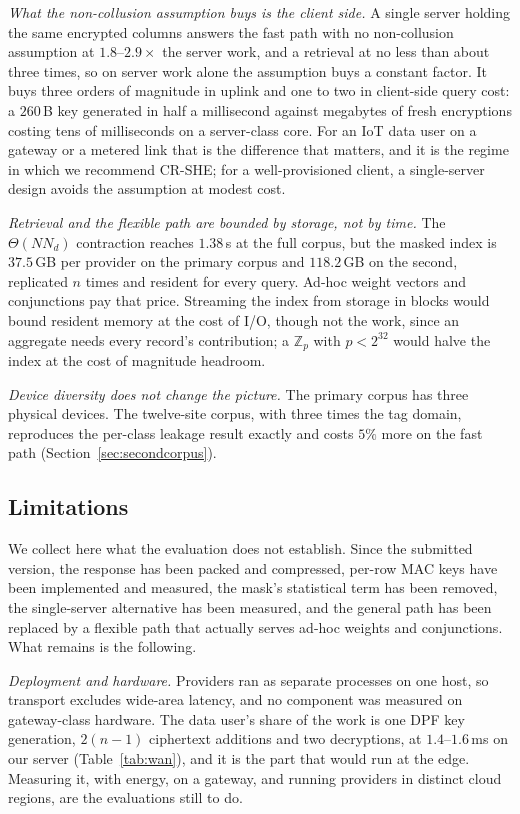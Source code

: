 \documentclass[a4paper,fleqn]{cas-dc}
\newif\ifauthorchecks
\newcommand{\authorcheck}[1]{\ifauthorchecks{\color{red}\textsf{[Authors: #1]}}\fi}
\begin{document}
\emph{What the non-collusion assumption buys is the client side.} A single
server holding the same encrypted columns answers the fast path with no
non-collusion assumption at $1.8$--$2.9\times$ the server work, and a
retrieval at no less than about three times, so on server work alone the
assumption buys a constant factor. It buys three orders of magnitude in uplink
and one to two in client-side query cost: a $260$\,B key generated in half a
millisecond against megabytes of fresh encryptions costing tens of
milliseconds on a server-class core. For an IoT data user on a gateway or a
metered link that is the difference that matters, and it is the regime in
which we recommend CR-SHE; for a well-provisioned client, a single-server
design avoids the assumption at modest cost.

\emph{Retrieval and the flexible path are bounded by storage, not by time.}
The $\Theta(N N_d)$ contraction reaches $1.38$\,s at the full corpus, but the
masked index is $37.5$\,GB per provider on the primary corpus and $118.2$\,GB
on the second, replicated $n$ times and resident for every query. Ad-hoc
weight vectors and conjunctions pay that price. Streaming the index from
storage in blocks would bound resident memory at the cost of I/O, though not
the work, since an aggregate needs every record's contribution; a
$\mathbb{Z}_p$ with $p<2^{32}$ would halve the index at the cost of magnitude
headroom.

\emph{Device diversity does not change the picture.} The primary corpus has
three physical devices. The twelve-site corpus, with three times the tag
domain, reproduces the per-class leakage result exactly and costs $5\%$ more
on the fast path (Section~\ref{sec:secondcorpus}).

\subsection{Limitations}
\label{sec:limits}
We collect here what the evaluation does not establish. Since the submitted
version, the response has been packed and compressed, per-row MAC keys have
been implemented and measured, the mask's statistical term has been removed,
the single-server alternative has been measured, and the general path has
been replaced by a flexible path that actually serves ad-hoc weights and
conjunctions. What remains is the following.

\emph{Deployment and hardware.} Providers ran as separate processes on one
host, so transport excludes wide-area latency, and no component was measured
on gateway-class hardware. The data user's share of the work is one DPF key
generation, $2(n-1)$ ciphertext additions and two decryptions, at
$1.4$--$1.6$\,ms on our server (Table~\ref{tab:wan}), and it is the part that
would run at the edge. Measuring it, with energy, on a gateway, and running
providers in distinct cloud regions, are the evaluations still to do.
\authorcheck{Run the deployment with providers in at least two cloud regions
before resubmitting; "premature" most likely refers to this.}
\end{document}
